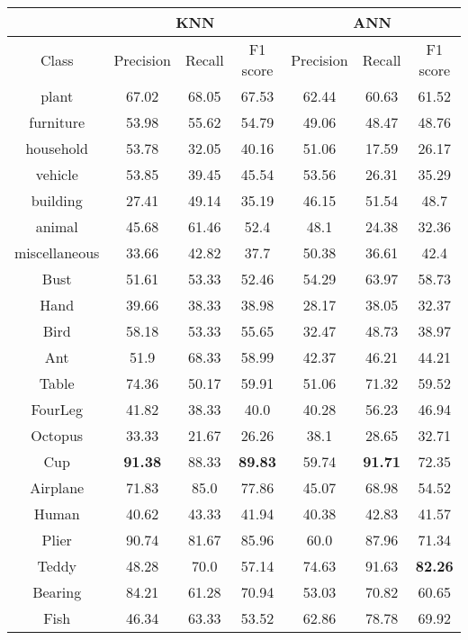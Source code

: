 \begin{table}[H]
    \centering
    \begin{tabular}{c|c|c|c|c|c|c}
         & \multicolumn{3}{c|}{KNN} & \multicolumn{3}{c}{ANN} \\
        \hline
        Class & Precision & Recall & F1 score & Precision & Recall & F1 score \\
        \hline
        plant & 67.02 & 68.05 & 67.53 & 62.44 & 60.63 & 61.52 \\ 
        furniture & 53.98 & 55.62 & 54.79 & 49.06 & 48.47 & 48.76 \\
        household & 53.78 & 32.05 & 40.16 & 51.06 & 17.59 & 26.17 \\ 
        vehicle & 53.85 & 39.45 & 45.54 & 53.56 & 26.31 & 35.29 \\ 
        building & 27.41 & 49.14 & 35.19 & 46.15 & 51.54 & 48.7 \\ 
        animal & 45.68 & 61.46 & 52.4 & 48.1 & 24.38 & 32.36 \\ 
        miscellaneous & 33.66 & 42.82 & 37.7 & 50.38 & 36.61 & 42.4 \\ 
        Bust & 51.61 & 53.33 & 52.46 & 54.29 & 63.97 & 58.73 \\ 
        Hand & 39.66 & 38.33 & 38.98 & 28.17 & 38.05 & 32.37 \\ 
        Bird & 58.18 & 53.33 & 55.65 & 32.47 & 48.73 & 38.97 \\ 
        Ant & 51.9 & 68.33 & 58.99 & 42.37 & 46.21 & 44.21 \\ 
        Table & 74.36 & 50.17 & 59.91 & 51.06 & 71.32 & 59.52 \\ 
        FourLeg & 41.82 & 38.33 & 40.0 & 40.28 & 56.23 & 46.94 \\ 
        Octopus & 33.33 & 21.67 & 26.26 & 38.1 & 28.65 & 32.71 \\ 
        Cup & \textbf{91.38} & 88.33 & \textbf{89.83} & 59.74 & \textbf{91.71} & 72.35 \\ 
        Airplane & 71.83 & 85.0 & 77.86 & 45.07 & 68.98 & 54.52 \\ 
        Human & 40.62 & 43.33 & 41.94 & 40.38 & 42.83 & 41.57 \\ 
        Plier & 90.74 & 81.67 & 85.96 & 60.0 & 87.96 & 71.34 \\ 
        Teddy & 48.28 & 70.0 & 57.14 & 74.63 & 91.63 & \textbf{82.26} \\ 
        Bearing & 84.21 & 61.28 & 70.94 & 53.03 & 70.82 & 60.65 \\ 
        Fish & 46.34 & 63.33 & 53.52 & 62.86 & 78.78 & 69.92 \\ 

\end{tabular}
\end{table}
